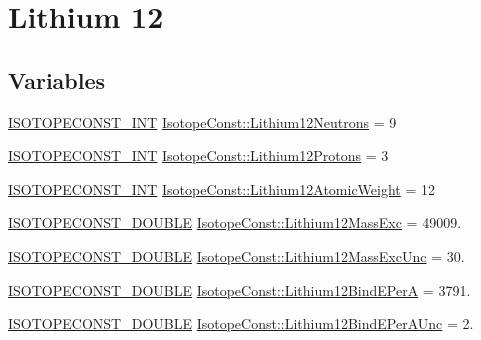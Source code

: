 \hypertarget{group___isotope_const-_lithium-_li12}{}\section{Lithium 12}
\label{group___isotope_const-_lithium-_li12}
\subsection*{Variables}
\begin{DoxyCompactItemize}
\item 
\mbox{\hyperlink{group___isotope_const-_macros_ga5f18360b3e99483a35c32d789e62621c}{I\+S\+O\+T\+O\+P\+E\+C\+O\+N\+S\+T\+\_\+\+I\+NT}} \mbox{\hyperlink{group___isotope_const-_lithium-_li12_ga21a46e79bff008ada1388ee8bfe103e8}{Isotope\+Const\+::\+Lithium12\+Neutrons}} = 9
\item 
\mbox{\hyperlink{group___isotope_const-_macros_ga5f18360b3e99483a35c32d789e62621c}{I\+S\+O\+T\+O\+P\+E\+C\+O\+N\+S\+T\+\_\+\+I\+NT}} \mbox{\hyperlink{group___isotope_const-_lithium-_li12_ga5fbd3470395413884ac1a06b249f49f3}{Isotope\+Const\+::\+Lithium12\+Protons}} = 3
\item 
\mbox{\hyperlink{group___isotope_const-_macros_ga5f18360b3e99483a35c32d789e62621c}{I\+S\+O\+T\+O\+P\+E\+C\+O\+N\+S\+T\+\_\+\+I\+NT}} \mbox{\hyperlink{group___isotope_const-_lithium-_li12_ga7a5db67306ca8f910440624b87ae716d}{Isotope\+Const\+::\+Lithium12\+Atomic\+Weight}} = 12
\item 
\mbox{\hyperlink{group___isotope_const-_macros_ga8f45a7272ce02c0b4c65c44636ed719a}{I\+S\+O\+T\+O\+P\+E\+C\+O\+N\+S\+T\+\_\+\+D\+O\+U\+B\+LE}} \mbox{\hyperlink{group___isotope_const-_lithium-_li12_ga8ef615fa1f9367d79bffba919afe8fa2}{Isotope\+Const\+::\+Lithium12\+Mass\+Exc}} = 49009.
\item 
\mbox{\hyperlink{group___isotope_const-_macros_ga8f45a7272ce02c0b4c65c44636ed719a}{I\+S\+O\+T\+O\+P\+E\+C\+O\+N\+S\+T\+\_\+\+D\+O\+U\+B\+LE}} \mbox{\hyperlink{group___isotope_const-_lithium-_li12_ga347fc1fcc550c3cd9d4a679cc47ce4ee}{Isotope\+Const\+::\+Lithium12\+Mass\+Exc\+Unc}} = 30.
\item 
\mbox{\hyperlink{group___isotope_const-_macros_ga8f45a7272ce02c0b4c65c44636ed719a}{I\+S\+O\+T\+O\+P\+E\+C\+O\+N\+S\+T\+\_\+\+D\+O\+U\+B\+LE}} \mbox{\hyperlink{group___isotope_const-_lithium-_li12_gad5439f216ef07f72ca14eda3c53c83da}{Isotope\+Const\+::\+Lithium12\+Bind\+E\+PerA}} = 3791.
\item 
\mbox{\hyperlink{group___isotope_const-_macros_ga8f45a7272ce02c0b4c65c44636ed719a}{I\+S\+O\+T\+O\+P\+E\+C\+O\+N\+S\+T\+\_\+\+D\+O\+U\+B\+LE}} \mbox{\hyperlink{group___isotope_const-_lithium-_li12_ga7aae12bfb49b1d3e0ead25a4749cc096}{Isotope\+Const\+::\+Lithium12\+Bind\+E\+Per\+A\+Unc}} = 2.

\end{DoxyCompactItemize}

